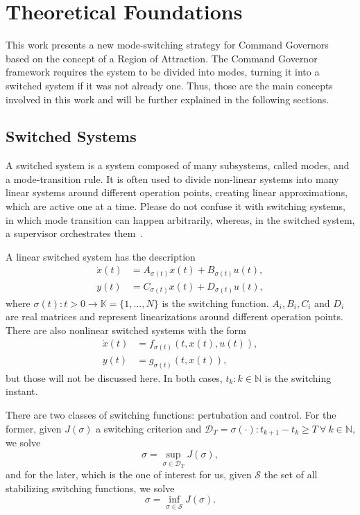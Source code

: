 
\chapter{Theoretical Foundations}%
\label{chp:theoretical-foundations}

This work presents a new mode-switching strategy for Command Governors based on
the concept of a Region of Attraction. The Command Governor framework requires
the system to be divided into modes, turning it into a switched system if it was
not already one. Thus, those are the main concepts involved in this work and
will be further explained in the following sections.

\section{Switched Systems}%
\label{sec:switched-systems}

A switched system is a system composed of many subsystems, called modes, and a mode-transition rule. It is often used to divide non-linear systems into many linear systems around different operation points, creating linear
approximations, which are active one at a time. Please do not confuse it with
switching systems, in which mode transition can happen arbitrarily, whereas, in
the switched system, a supervisor orchestrates
them~\parencite{lucia.franzè:stabilization,liberzon.morse:basic}.

A linear switched system has the description
%
\begin{align}
  \dot{x}(t) & = A_{\sigma(t)}x(t) + B_{\sigma(t)}u(t), \\
  y(t)       & = C_{\sigma(t)}x(t) + D_{\sigma(t)}u(t),
\end{align}
%
where \(\sigma(t):t>0\rightarrow\mathbb{K}=\{1,\ldots,N\}\) is the switching function.
\(A_{i}, B_{i}, C_{i}\) and \(D_{i}\) are real matrices and represent
linearizations around different operation points. There are also nonlinear
switched systems with the form
%
\begin{align}
  \dot{x}(t) & = f_{\sigma(t)}(t,x(t),u(t)), \\
  y(t)       & = g_{\sigma(t)}(t,x(t)),
\end{align}
%
but those will not be discussed here. In both cases, \(t_{k}:k\in\mathbb{N}\) is
the switching instant.

There are two classes of switching functions: pertubation and control. For the
former, given \(J(\sigma)\) a switching criterion and
\(\mathcal{D}_{T}=\sigma(\cdot):t_{k+1}-t_{k}\ge{}T~\forall{}~k\in{}\mathbb{N}\), we solve
%
\begin{equation}
  \sigma = \sup_{\sigma\in\mathcal{D}_{T}} J(\sigma),
\end{equation}
%
and for the later, which is the one of interest for us, given \(\mathcal{S}\)
the set of all stabilizing switching functions, we solve
%
\begin{equation}
  \sigma = \inf_{\sigma\in\mathcal{S}} J(\sigma).
\end{equation}

